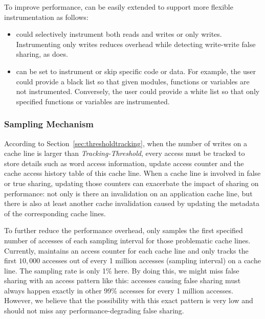 To improve performance,
\Predator{} can be easily extended to support more flexible instrumentation as follows:
\begin{itemize}
\item
\Predator{} could selectively instrument both reads and writes or only writes.
Instrumenting only writes reduces overhead while detecting write-write false sharing, 
as \Sheriff{} does. 
\item
\Predator{} can be set to instrument or skip specific code or data. 
For example, the user could provide a black list so that given modules,
functions or variables are not instrumented. 
Conversely, the user could provide a white list so that only specified functions or variables are instrumented. 
\end{itemize}

\subsubsection{Sampling Mechanism}
\label{sec:sample}
According to Section~\ref{sec:thresholdtracking}, when the number of
writes on a cache line is larger than {\it Tracking-Threshold}, every
access must be tracked to store details such as word access
information, update access counter and the cache access history table
of this cache line.  When a cache line is involved in false or true
sharing, updating those counters can exacerbate the impact of sharing
on performance: not only is there an invalidation on an application
cache line, but there is also at least another cache invalidation
caused by updating the metadata of the corresponding cache lines.

To further reduce the performance overhead, \Predator{} only samples the first specified
number of accesses of each sampling interval for those problematic cache lines. 
Currently, \Predator{} maintains an access counter for each cache line 
and only tracks the first $10,000$ accesses out of  every 1 million accesses 
(sampling interval) on a cache line.
The sampling rate is only 1\% here.
By doing this, we might miss false sharing with an access pattern like this:
accesses causing false sharing must always 
happen exactly in other 99\% accesses for every 1 million accesses.
However, we believe that the possibility with this exact pattern is very low and \Predator{} 
should not miss any performance-degrading false sharing.  

